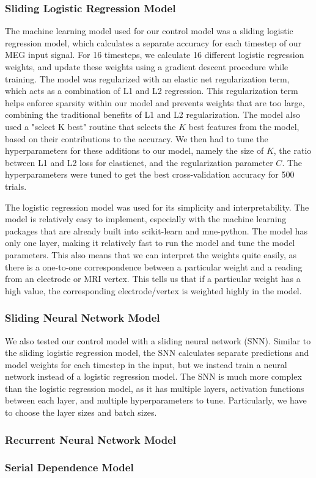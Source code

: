 \documentclass[../main.tex]{subfiles}
\begin{document}
\subsubsection{Sliding Logistic Regression Model}
The machine learning model used for our control model was a sliding logistic regression model, which calculates a separate accuracy for each timestep of our MEG input signal. For 16 timesteps, we calculate 16 different logistic regression weights, and update these weights using a gradient descent procedure while training. The model was regularized with an elastic net regularization term, which acts as a combination of L1 and L2 regression. This regularization term helps enforce sparsity within our model and prevents weights that are too large, combining the traditional benefits of L1 and L2 regularization. The model also used a "select K best" routine that selects the $K$ best features from the model, based on their contributions to the accuracy. We then had to tune the hyperparameters for these additions to our model, namely the size of $K$, the ratio between L1 and L2 loss for elasticnet, and the regularization parameter $C$. The hyperparameters were tuned to get the best cross-validation accuracy for 500 trials.


The logistic regression model was used for its simplicity and interpretability. The model is relatively easy to implement, especially with the machine learning packages that are already built into scikit-learn and mne-python. The model has only one layer, making it relatively fast to run the model and tune the model parameters. This also means that we can interpret the weights quite easily, as there is a one-to-one correspondence between a particular weight and a reading from an electrode or MRI vertex. This tells us that if a particular weight has a high value, the corresponding electrode/vertex is weighted highly in the model.

\subsubsection{Sliding Neural Network Model}
We also tested our control model with a sliding neural network (SNN). Similar to the sliding logistic regression model, the SNN calculates separate predictions and model weights for each timestep in the input, but we instead train a neural network instead of a logistic regression model. The SNN is much more complex than the logistic regression model, as it has multiple layers, activation functions between each layer, and multiple hyperparameters to tune. Particularly, we have to choose the layer sizes and batch sizes.


\subsubsection{Recurrent Neural Network Model}

\subsubsection{Serial Dependence Model}
\end{document}
